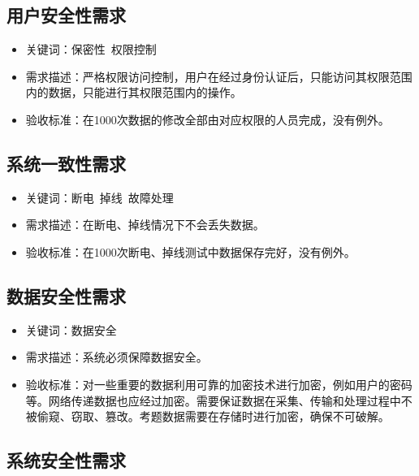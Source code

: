 \documentclass[hyperref, a4paper]{ctexart}
\providecommand{\tightlist}{%
  \setlength{\itemsep}{0pt}\setlength{\parskip}{0pt}}
\begin{document}
\hypertarget{ux7528ux6237ux5b89ux5168ux6027ux9700ux6c42}{%
\subsection{用户安全性需求}\label{ux7528ux6237ux5b89ux5168ux6027ux9700ux6c42}}

\begin{itemize}
\tightlist
\item
  关键词：保密性~权限控制
\item
  需求描述：严格权限访问控制，用户在经过身份认证后，只能访问其权限范围内的数据，只能进行其权限范围内的操作。
\item
  验收标准：在1000次数据的修改全部由对应权限的人员完成，没有例外。
\end{itemize}

\hypertarget{ux7cfbux7edfux4e00ux81f4ux6027ux9700ux6c42}{%
\subsection{系统一致性需求}\label{ux7cfbux7edfux4e00ux81f4ux6027ux9700ux6c42}}

\begin{itemize}
\tightlist
\item
  关键词：断电~掉线~故障处理
\item
  需求描述：在断电、掉线情况下不会丢失数据。
\item
  验收标准：在1000次断电、掉线测试中数据保存完好，没有例外。
\end{itemize}

\hypertarget{ux6570ux636eux5b89ux5168ux6027ux9700ux6c42}{%
\subsection{数据安全性需求}\label{ux6570ux636eux5b89ux5168ux6027ux9700ux6c42}}

\begin{itemize}
\tightlist
\item
  关键词：数据安全
\item
  需求描述：系统必须保障数据安全。
\item
  验收标准：对一些重要的数据利用可靠的加密技术进行加密，例如用户的密码等。网络传递数据也应经过加密。需要保证数据在采集、传输和处理过程中不被偷窥、窃取、篡改。考题数据需要在存储时进行加密，确保不可破解。
\end{itemize}

\hypertarget{ux7cfbux7edfux5b89ux5168ux6027ux9700ux6c42}{%
\subsection{系统安全性需求}\label{ux7cfbux7edfux5b89ux5168ux6027ux9700ux6c42}}
\end{document}
